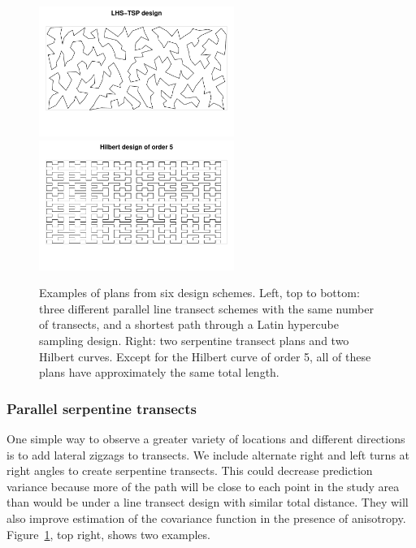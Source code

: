 \documentclass[review]{elsarticle}
\begin{document}
\begin{figure}
\includegraphics[width=2.5in]{LHS-TSP000161.pdf}
\includegraphics[width=2.5in]{Hilbert000237.pdf}

\caption{Examples of plans from six design schemes. Left, top to bottom: three
different parallel line transect schemes with the same number of transects, and
a shortest path through a Latin hypercube sampling design. Right: two
serpentine transect plans and two Hilbert curves. Except for the Hilbert curve
of order 5, all of these plans have approximately the same total length.}
\label{plancomparison}
\end{figure}


\subsubsection{Parallel serpentine transects}

One simple way to observe a greater variety of locations and different
directions is to add lateral zigzags to transects. We include alternate right
and left turns at right angles to create serpentine transects. This could
decrease prediction variance because more of the path will be close to each
point in the study area than would be under a line transect design with similar
total distance. They will also improve estimation of the covariance function
in the presence of anisotropy. Figure~\ref{plancomparison}, top right, shows
two examples.

\end{document}
